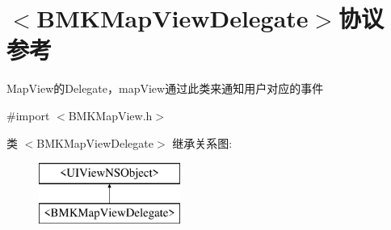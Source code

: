 \hypertarget{protocol_b_m_k_map_view_delegate-p}{\section{$<$B\+M\+K\+Map\+View\+Delegate$>$协议 参考}
\label{protocol_b_m_k_map_view_delegate-p}
}


Map\+View的\+Delegate，map\+View通过此类来通知用户对应的事件  




{\ttfamily \#import $<$B\+M\+K\+Map\+View.\+h$>$}

类 $<$B\+M\+K\+Map\+View\+Delegate$>$ 继承关系图\+:\begin{figure}[H]
\begin{center}
\leavevmode
\includegraphics[height=2.000000cm]{protocol_b_m_k_map_view_delegate-p}
\end{center}
\end{figure}
